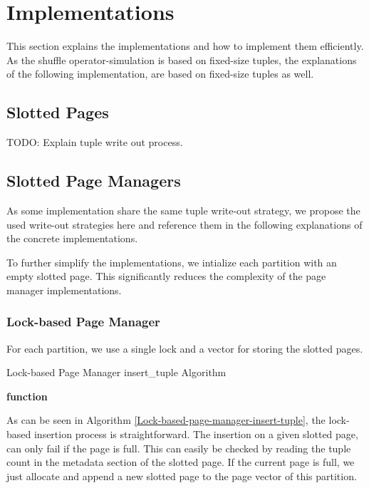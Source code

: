 
\chapter{Implementations}\label{chapter:implementations}
This section explains the implementations and how to implement them efficiently. As the shuffle operator-simulation is based on fixed-size tuples, the explanations of the following implementation, are based on fixed-size tuples as well.

\section{Slotted Pages}
TODO: Explain tuple write out process.
\section{Slotted Page Managers}
As some implementation share the same tuple write-out strategy, we propose the used write-out strategies here and reference them in the following explanations of the concrete implementations.

To further simplify the implementations, we intialize each partition with an empty slotted page. This significantly reduces the complexity of the page manager implementations.

\subsection{Lock-based Page Manager}
For each partition, we use a single lock and a vector for storing the slotted pages.
\begin{algorithm}[h]
\caption{Lock-based Page Manager insert\_tuple Algorithm}\label{Lock-based-page-manager-insert-tuple}


\textbf{function}
\end{algorithm}
As can be seen in Algorithm \ref{Lock-based-page-manager-insert-tuple}, the lock-based insertion process is straightforward.
The insertion on a given slotted page, can only fail if the page is full.
This can easily be checked by reading the tuple count in the metadata section of the slotted page.
If the current page is full, we just allocate and append a new slotted page to the page vector of this partition.

